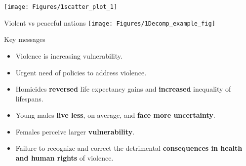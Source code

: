 \documentclass[xcolor={dvipsnames}]{beamer}
\begin{document}
\begin{frame}

\begin{center} 
\hspace*{-1cm}   
	\texttt{[image: Figures/1scatter\_plot\_1]}	
\end{center}

\bigskip
	

\end{frame}


\begin{frame}

Violent vs peaceful nations
\hspace*{-.5cm}   
	\texttt{[image: Figures/1Decomp\_example\_fig]}	

\bigskip
	

\end{frame}


\begin{frame}
\Large{
Key messages \pause
		\begin{itemize}
		\item Violence is increasing vulnerability.\pause
		
	    \item Urgent need of policies to address violence. \pause
		
		\item Homicides \textbf{reversed} life expectancy gains and \textbf{increased} inequality of lifespans. \pause
		
		\item Young males \textbf{live less}, on average, and \textbf{face more uncertainty}.\pause
		
		\item Females perceive larger \textbf{vulnerability}.\pause
		
	    \item Failure to recognize and correct the detrimental \textbf{consequences in health and human rights} of 					violence.
							
		\end{itemize}

}
\end{frame}





\end{document}
